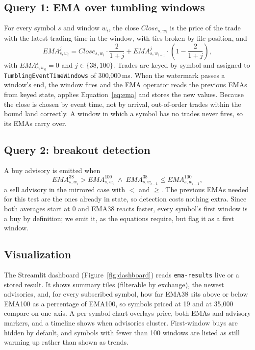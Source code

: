 \documentclass[sigconf]{acmart}
\begin{document}
\subsection{Query 1: EMA over tumbling windows}
For every symbol $s$ and window $w_i$, the close $\mathit{Close}_{s,w_i}$ is the price of the trade with the latest trading time in the window, with ties broken by file position, and
\begin{equation}
  \mathit{EMA}^{j}_{s,w_i} = \mathit{Close}_{s,w_i}\cdot\frac{2}{1+j}
  + \mathit{EMA}^{j}_{s,w_{i-1}}\cdot\left(1-\frac{2}{1+j}\right),
  \label{eq:ema}
\end{equation}
with $\mathit{EMA}^{j}_{s,w_0}=0$ and $j\in\{38,100\}$. Trades are keyed by symbol and assigned to \texttt{TumblingEventTimeWindows} of 300,000\,ms. When the watermark passes a window's end, the window fires and the EMA operator reads the previous EMAs from keyed state, applies Equation~\ref{eq:ema} and stores the new values. Because the close is chosen by event time, not by arrival, out-of-order trades within the bound land correctly. A window in which a symbol has no trades never fires, so its EMAs carry over.

\subsection{Query 2: breakout detection}
A buy advisory is emitted when
\[\mathit{EMA}^{38}_{s,w_i} > \mathit{EMA}^{100}_{s,w_i} \;\wedge\; \mathit{EMA}^{38}_{s,w_{i-1}} \le \mathit{EMA}^{100}_{s,w_{i-1}},\]
a sell advisory in the mirrored case with $<$ and $\ge$. The previous EMAs needed for this test are the ones already in state, so detection costs nothing extra. Since both averages start at 0 and EMA38 reacts faster, every symbol's first window is a buy by definition; we emit it, as the equations require, but flag it as a first window.

\subsection{Visualization}
The Streamlit dashboard (Figure~\ref{fig:dashboard}) reads \texttt{ema-results} live or a stored result. It shows summary tiles (filterable by exchange), the newest advisories, and, for every subscribed symbol, how far EMA38 sits above or below EMA100 as a percentage of EMA100, so symbols priced at 19 and at 35,000 compare on one axis. A per-symbol chart overlays price, both EMAs and advisory markers, and a timeline shows when advisories cluster. First-window buys are hidden by default, and symbols with fewer than 100 windows are listed as still warming up rather than shown as trends.
\end{document}
